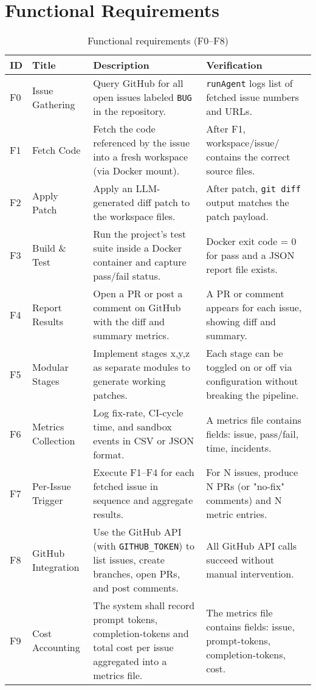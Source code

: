 \section{Functional Requirements}

\begin{table}[ht]
    \centering
    \small
    \begin{tabular*}{\textwidth}{@{\extracolsep{\fill}} p{1cm} p{3cm} p{7cm} p{4cm} @{}}
        \toprule
        \textbf{ID} & \textbf{Title} & \textbf{Description} & \textbf{Verification} \\
        \midrule
        F0 & Issue Gathering
        & Query GitHub for all open issues labeled \texttt{BUG} in the repository.
        & \texttt{runAgent} logs list of fetched issue numbers and URLs. \\[4pt]
        F1 & Fetch Code
        & Fetch the code referenced by the issue into a fresh workspace (via Docker mount).
        & After F1, workspace/issue/ contains the correct source files. \\[4pt]
        F2 & Apply Patch
        & Apply an LLM-generated diff patch to the workspace files.
        & After patch, \texttt{git diff} output matches the patch payload. \\[4pt]
        F3 & Build \& Test
        & Run the project's test suite inside a Docker container and capture pass/fail status.
        & Docker exit code = 0 for pass and a JSON report file exists. \\[4pt]
        F4 & Report Results
        & Open a PR or post a comment on GitHub with the diff and summary metrics.
        & A PR or comment appears for each issue, showing diff and summary. \\[4pt]
        F5 & Modular Stages
        & Implement stages x,y,z as separate modules to generate working patches.
        & Each stage can be toggled on or off via configuration without breaking the pipeline. \\[4pt]
        F6 & Metrics Collection
        & Log fix-rate, CI-cycle time, and sandbox events in CSV or JSON format.
        & A metrics file contains fields: issue, pass/fail, time, incidents. \\[4pt]
        F7 & Per-Issue Trigger
        & Execute F1--F4 for each fetched issue in sequence and aggregate results.
        & For N issues, produce N PRs (or "no-fix" comments) and N metric entries. \\[4pt]
        F8 & GitHub Integration
        & Use the GitHub API (with \texttt{GITHUB\_TOKEN}) to list issues, create branches, open PRs, and post comments.
        & All GitHub API calls succeed without manual intervention. \\ [4pt]
        F9 & Cost Accounting
        & The system shall record prompt tokens, completion-tokens and total cost per issue aggregated into a metrics file.
        & The metrics file contains fields: issue, prompt-tokens, completion-tokens, cost. \\[4pt]
        \bottomrule
    \end{tabular*}
    \caption{Functional requirements (F0--F8)}
\end{table}

